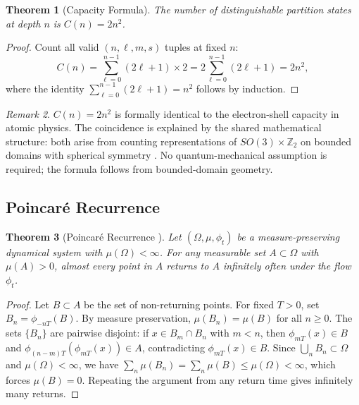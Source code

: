 \documentclass[11pt,twocolumn,a4paper]{article}
\newtheorem{theorem}{Theorem}[section]
\theoremstyle{definition}
\theoremstyle{remark}
\newtheorem{remark}[theorem]{Remark}
\begin{document}
\begin{theorem}[Capacity Formula]
\label{thm:capacity}
The number of distinguishable partition states at depth $n$ is $C(n) = 2n^2$.
\end{theorem}

\begin{proof}
Count all valid $(n,\ell,m,s)$ tuples at fixed $n$:
\begin{equation}
C(n) = \sum_{\ell=0}^{n-1}(2\ell+1) \times 2
= 2\sum_{\ell=0}^{n-1}(2\ell+1) = 2n^2,
\end{equation}
where the identity $\sum_{\ell=0}^{n-1}(2\ell+1) = n^2$ follows by induction.
\end{proof}

\begin{remark}
$C(n) = 2n^2$ is formally identical to the electron-shell capacity in atomic
physics. The coincidence is explained by the shared mathematical structure:
both arise from counting representations of $SO(3) \times \mathbb{Z}_2$ on
bounded domains with spherical symmetry \citep{sakurai2017, courant1953}.
No quantum-mechanical assumption is required; the formula follows from
bounded-domain geometry.
\end{remark}

\subsection{Poincaré Recurrence}

\begin{theorem}[Poincaré Recurrence \citep{poincare1890}]
\label{thm:recurrence}
Let $(\Omega, \mu, \phi_t)$ be a measure-preserving dynamical system
with $\mu(\Omega) < \infty$. For any measurable set $A \subset \Omega$
with $\mu(A) > 0$, almost every point in $A$ returns to $A$
infinitely often under the flow $\phi_t$.
\end{theorem}

\begin{proof}
Let $B \subset A$ be the set of non-returning points. For fixed $T > 0$, set
$B_n = \phi_{-nT}(B)$. By measure preservation, $\mu(B_n) = \mu(B)$ for all
$n \geq 0$. The sets $\{B_n\}$ are pairwise disjoint: if $x \in B_m \cap B_n$
with $m < n$, then $\phi_{mT}(x) \in B$ and $\phi_{(n-m)T}(\phi_{mT}(x))
\in A$, contradicting $\phi_{mT}(x) \in B$. Since $\bigcup_n B_n \subset \Omega$
and $\mu(\Omega) < \infty$, we have $\sum_n \mu(B_n) = \sum_n \mu(B)
\leq \mu(\Omega) < \infty$, which forces $\mu(B) = 0$. Repeating
the argument from any return time gives infinitely many returns.
\end{proof}
\end{document}
